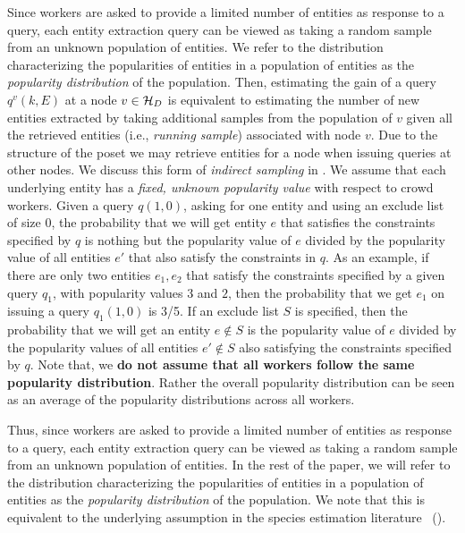 Since workers are asked to provide a limited number of entities as response to a query, each entity extraction query can be viewed as taking a random sample from an unknown population of entities. We refer to the distribution characterizing the popularities of entities in a population of entities as the {\em popularity distribution} of the population. Then, estimating the gain of a query $q^v(k,E)$ at a node $v \in \mathcal{H}_D$ is equivalent to estimating the number of new entities extracted by taking additional samples from the population of $v$ given all the retrieved entities (i.e., {\em running sample}) associated with node $v$. Due to the structure of the poset we may retrieve entities for a node when issuing queries at other nodes. We discuss this form of {\em indirect sampling} in . 
\fi
\iftr
{} We assume that each underlying entity has a {\em fixed, unknown popularity value} with respect to crowd workers. Given a query $q(1, 0)$, asking for one entity and using an exclude list of size $0$, the probability that we will get entity $e$ that satisfies the constraints specified by $q$ is nothing but the popularity value of $e$ divided by the popularity value of all entities $e'$ that also satisfy the constraints in $q$. As an example, if there are only two entities $e_1, e_2$ that satisfy the constraints specified by a given query $q_1$, with popularity values $3$ and $2$,
then the probability that we get $e_1$ on issuing a query $q_1(1, 0)$ is 3/5. 
If an exclude list $S$ is specified, then the probability that we will get an entity $e \notin S$ is the popularity value of $e$ divided by the popularity values of all entities $e' \notin S$ also satisfying the constraints specified by $q$. Note that, we {\bf do not assume that all workers follow the same popularity distribution}. Rather the overall popularity distribution can be seen as an average of the popularity distributions across all workers.

Thus, since workers are asked to provide a limited number of entities as response to a query, each entity extraction query can be viewed as taking a random sample from an unknown population of entities. In the rest of the paper, we will refer to the distribution characterizing the popularities of entities in a population of entities as the {\em popularity distribution} of the population. We note that this is equivalent to the underlying assumption in the species estimation literature~\cite{chao:1992} ().

